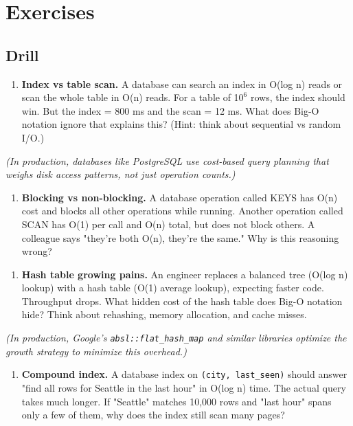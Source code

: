 \section{Exercises}

\subsection{Drill}

\begin{enumerate}
\item \textbf{Index vs table scan.} A database can search an index in O(log n) reads or scan the whole table in O(n) reads. For a table of 1$0^{6}$ rows, the index should win. But the index = 800 ms and the scan = 12 ms. What does Big-O notation ignore that explains this? (Hint: think about sequential vs random I/O.)
\end{enumerate}

   \textit{(In production, databases like PostgreSQL use cost-based query planning that weighs disk access patterns, not just operation counts.)}

\begin{enumerate}
\item \textbf{Blocking vs non-blocking.} A database operation called KEYS has O(n) cost and blocks all other operations while running. Another operation called SCAN has O(1) per call and O(n) total, but does not block others. A colleague says "they're both O(n), they're the same." Why is this reasoning wrong?
\end{enumerate}

\begin{enumerate}
\item \textbf{Hash table growing pains.} An engineer replaces a balanced tree (O(log n) lookup) with a hash table (O(1) average lookup), expecting faster code. Throughput drops. What hidden cost of the hash table does Big-O notation hide? Think about rehashing, memory allocation, and cache misses.
\end{enumerate}

   \textit{(In production, Google's \texttt{absl::flat\_hash\_map} and similar libraries optimize the growth strategy to minimize this overhead.)}

\begin{enumerate}
\item \textbf{Compound index.} A database index on \texttt{(city, last\_seen)} should answer "find all rows for Seattle in the last hour" in O(log n) time. The actual query takes much longer. If "Seattle" matches 10,000 rows and "last hour" spans only a few of them, why does the index still scan many pages?
\end{enumerate}

